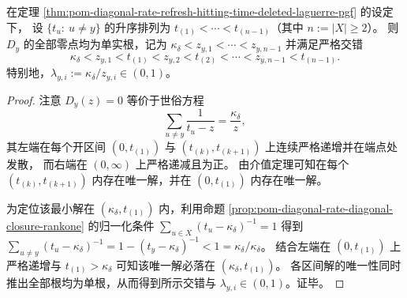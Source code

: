 \begin{theorem}\label{thm:pom-diagonal-rate-refresh-absorbing-laguerre-interlacing}
在定理 \ref{thm:pom-diagonal-rate-refresh-hitting-time-deleted-laguerre-pgf} 的设定下，
设 \(\{t_u:\ u\ne y\}\) 的升序排列为 \(t_{(1)}<\cdots<t_{(n-1)}\)（其中 \(n:=|X|\ge 2\)）。
则 \(D_y\) 的全部零点均为单实根，记为
\(
\kappa_\delta<z_{y,1}<\cdots<z_{y,n-1}
\)
并满足严格交错
\[
\kappa_\delta<z_{y,1}<t_{(1)}<z_{y,2}<t_{(2)}<\cdots<z_{y,n-1}<t_{(n-1)}.
\]
特别地，\(\lambda_{y,i}:=\kappa_\delta/z_{y,i}\in(0,1)\)。
\end{theorem}
\begin{proof}
注意 \(D_y(z)=0\) 等价于世俗方程
\[
\sum_{u\ne y}\frac{1}{t_u-z}=\frac{\kappa_\delta}{z},
\]
其左端在每个开区间 \((0,t_{(1)})\) 与 \((t_{(k)},t_{(k+1)})\) 上连续严格递增并在端点处发散，
而右端在 \((0,\infty)\) 上严格递减且为正。
由介值定理可知在每个 \((t_{(k)},t_{(k+1)})\) 内存在唯一解，并在 \((0,t_{(1)})\) 内存在唯一解。
\par
为定位该最小解在 \((\kappa_\delta,t_{(1)})\) 内，利用命题 \ref{prop:pom-diagonal-rate-diagonal-closure-rankone} 的归一化条件
\(
\sum_{u\in X}(t_u-\kappa_\delta)^{-1}=1
\)
得到
\(
\sum_{u\ne y}(t_u-\kappa_\delta)^{-1}=1-(t_y-\kappa_\delta)^{-1}<1=\kappa_\delta/\kappa_\delta
\)。
结合左端在 \((0,t_{(1)})\) 上严格递增与 \(t_{(1)}>\kappa_\delta\) 可知该唯一解必落在 \((\kappa_\delta,t_{(1)})\)。
各区间解的唯一性同时推出全部根均为单根，从而得到所示交错与 \(\lambda_{y,i}\in(0,1)\)。证毕。
\end{proof}

